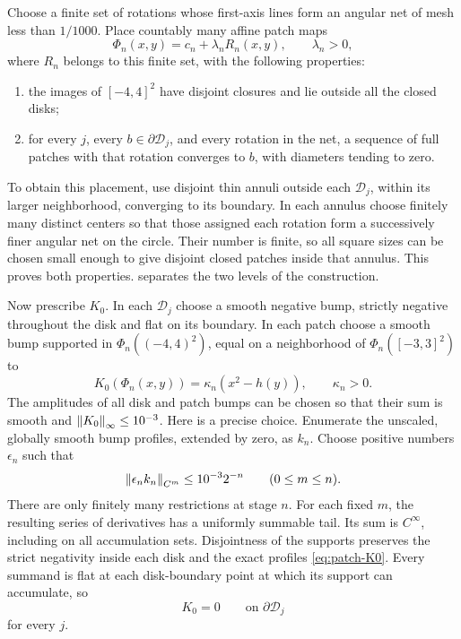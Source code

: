 Choose a finite set of rotations whose first-axis lines form an
angular net of mesh less than \(1/1000\).
Place countably many affine patch maps
\[
\Phi_n(x,y)=c_n+\lambda_nR_n(x,y),\qquad \lambda_n>0,
\]
where \(R_n\) belongs to this finite set, with the following properties:
\begin{enumerate}[label=(\roman*),leftmargin=2.3em]
\item the images of \([-4,4]^2\) have disjoint closures and lie
outside all the closed disks;
\item for every \(j\), every \(b\in\partial\mathcal D_j\), and every
rotation in the net, a sequence of full patches with that rotation
converges to \(b\), with diameters tending to zero.
\end{enumerate}
To obtain this placement, use disjoint thin annuli outside each
\(\mathcal D_j\), within its larger neighborhood, converging to
its boundary. In each annulus choose finitely many distinct centers
so that those assigned each rotation form a successively finer
angular net on the circle. Their number is finite, so all square
sizes can be chosen small enough to give disjoint closed patches
inside that annulus. This proves both properties.  separates the
two levels of the construction.



Now prescribe \(K_0\). In each \(\mathcal D_j\) choose a smooth
negative bump, strictly negative throughout the disk and flat on
its boundary. In each patch choose a smooth bump supported in
\(\Phi_n((-4,4)^2)\), equal on a neighborhood of
\(\Phi_n([-3,3]^2)\) to
\begin{equation}\label{eq:patch-K0}
K_0(\Phi_n(x,y))=\kappa_n(x^2-h(y)),\qquad \kappa_n>0.
\end{equation}
The amplitudes of all disk and patch bumps can be chosen so that
their sum is smooth and \(\left\lVert K_0\right\rVert_\infty\le10^{-3}\).
Here is a precise choice. Enumerate the unscaled, globally smooth
bump profiles, extended by zero, as \(k_n\). Choose positive
numbers \(\epsilon_n\) such that
\[
\left\lVert\epsilon_nk_n\right\rVert_{C^m}\le10^{-3}2^{-n}
\qquad (0\le m\le n).
\]
There are only finitely many restrictions at stage \(n\).
For each fixed \(m\), the resulting series of derivatives has
a uniformly summable tail. Its sum is \(C^\infty\), including
on all accumulation sets. Disjointness of the supports preserves
the strict negativity inside each disk and the exact profiles
\eqref{eq:patch-K0}. Every summand is flat at each disk-boundary
point at which its support can accumulate, so
\[
K_0=0\qquad\text{on }\partial\mathcal D_j
\]
for every \(j\).

